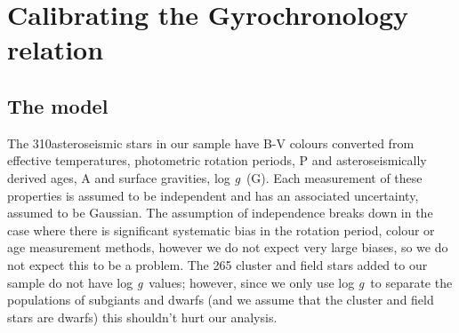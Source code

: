 \documentclass[10pt,preprint]{aastex}
\newcommand{\logg}{log \emph{g}~}
\newcommand{\teff}{$T_{eff}~$}
\newcommand{\nastero}{310}
\newcommand{\ntotal}{597~}
\begin{document}



\section{Calibrating the Gyrochronology relation}
\label{sec:gyro_cal}

\subsection{The model}

The \nastero asteroseismic stars in our sample have B-V colours converted from effective temperatures, photometric rotation periods, P and asteroseismically derived ages, A and surface gravities, \logg (G).
Each measurement of these properties is assumed to be independent and has an associated uncertainty, assumed to be Gaussian.
The assumption of independence breaks down in the case where there is significant systematic bias in the rotation period, colour or age measurement methods, however we do not expect very large biases, so we do not expect this to be a problem.
The 265 cluster and field stars added to our sample do not have \logg values; however, since we only use \logg to separate the populations of subgiants and dwarfs (and we assume that the cluster and field stars are dwarfs) this shouldn't hurt our analysis.
\end{document}
